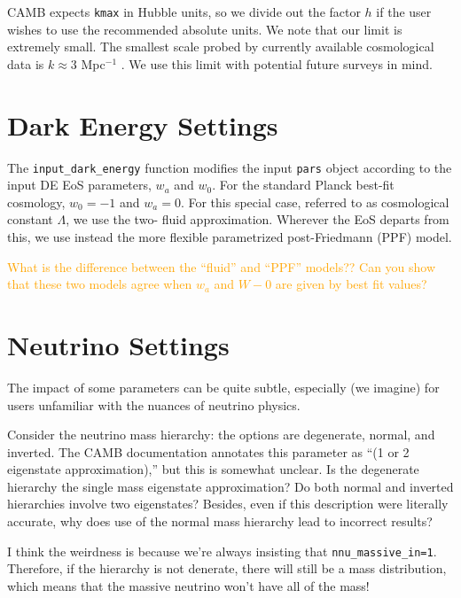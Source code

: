 CAMB expects \verb|kmax| in Hubble units, so we divide out the factor $h$ if 
the user wishes to use the recommended absolute units.
We note that our limit is extremely small. The smallest scale probed by
currently available cosmological data is $k \approx 3$ Mpc$^{-1}$
. We use this limit with potential future surveys in mind.


\section{Dark Energy Settings}

The \verb|input_dark_energy| function modifies the input \verb|pars| object
according to the input DE EoS parameters, $w_a$ and $w_0$. For the standard
Planck best-fit cosmology, $w_0 = -1$ and $w_a = 0$. For this special case,
referred to as cosmological constant $\Lambda$, we use the two-
fluid approximation. Wherever the EoS departs from this, we use instead the
more flexible parametrized post-Friedmann (PPF) model.

\textcolor{orange}{What is the difference between the ``fluid'' and ``PPF''
models?? Can you show that these two models agree when $w_a$ and $W-0$ are
given by best fit values?}

\section{Neutrino Settings}


The impact of some parameters can be quite subtle, especially (we imagine)
for users unfamiliar with the nuances of neutrino physics.

Consider the neutrino mass 
hierarchy: the options are degenerate, normal, and inverted. The CAMB 
documentation annotates this parameter as ``(1 or 2 eigenstate 
approximation),'' but this is somewhat unclear. Is the degenerate hierarchy 
the single mass eigenstate approximation? Do both normal and inverted 
hierarchies involve two eigenstates? Besides, even if this description were
literally accurate, why does use of the normal mass hierarchy lead to
incorrect results?

I think the weirdness is because we're always
insisting that \verb|nnu_massive_in=1|. Therefore,
if the hierarchy is not denerate, there will still
be a mass distribution, which means that the 
massive neutrino won't have all of the mass!

